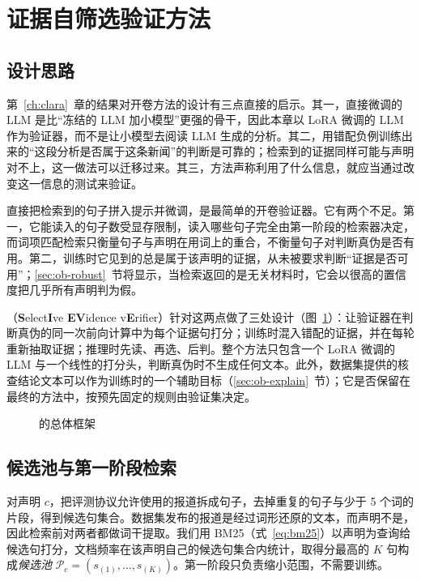 \section{证据自筛选验证方法 \ours{}}\label{sec:ob-method}

\subsection{设计思路}

第~\ref{ch:clara}~章的结果对开卷方法的设计有三点直接的启示。其一，直接微调的 LLM 是比“冻结的 LLM 加小模型”更强的骨干，因此本章以 LoRA 微调的 LLM 作为验证器，而不是让小模型去阅读 LLM 生成的分析。其二，用错配负例训练出来的“这段分析是否属于这条新闻”的判断是可靠的；检索到的证据同样可能与声明对不上，这一做法可以迁移过来。其三，方法声称利用了什么信息，就应当通过改变这一信息的测试来验证。

直接把检索到的句子拼入提示并微调，是最简单的开卷验证器。它有两个不足。第一，它能读入的句子数受显存限制，读入哪些句子完全由第一阶段的检索器决定，而词项匹配检索只衡量句子与声明在用词上的重合，不衡量句子对判断真伪是否有用。第二，训练时它见到的总是属于该声明的证据，从未被要求判断“证据是否可用”；\ref{sec:ob-robust}~节将显示，当检索返回的是无关材料时，它会以很高的置信度把几乎所有声明判为假。

\ours{}（\textbf{S}elect\textbf{I}ve \textbf{EV}idence v\textbf{E}rifier）针对这两点做了三处设计（图~\ref{fig:ob-framework}）：让验证器在判断真伪的同一次前向计算中为每个证据句打分；训练时混入错配的证据，并在每轮重新抽取证据；推理时先读、再选、后判。整个方法只包含一个 LoRA 微调的 LLM 与一个线性的打分头，判断真伪时不生成任何文本。此外，数据集提供的核查结论文本可以作为训练时的一个辅助目标（\ref{sec:ob-explain}~节）；它是否保留在最终的方法中，按预先固定的规则由验证集决定。

\begin{figure}[htbp]
\centering
\resizebox{\linewidth}{!}{}
\caption{\ours{} 的总体框架}\label{fig:ob-framework}
\end{figure}

\subsection{候选池与第一阶段检索}

对声明 $c$，把评测协议允许使用的报道拆成句子，去掉重复的句子与少于 5 个词的片段，得到候选句集合。数据集发布的报道是经过词形还原的文本，而声明不是，因此检索前对两者都做词干提取。我们用 BM25（式~\eqref{eq:bm25}）以声明为查询给候选句打分，文档频率在该声明自己的候选句集合内统计，取得分最高的 $K$ 句构成\emph{候选池} $\mathcal P_c=(s_{(1)},\dots,s_{(K)})$。第一阶段只负责缩小范围，不需要训练。

